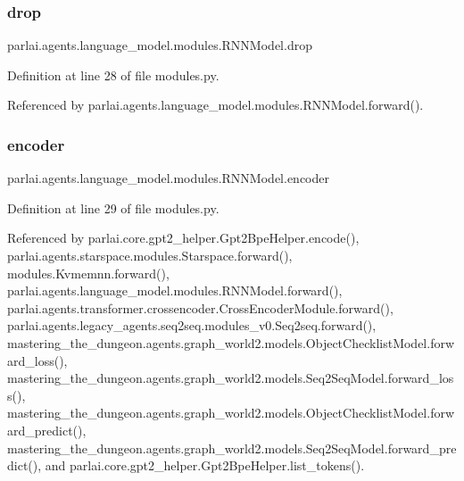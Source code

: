 \subsubsection{\texorpdfstring{drop}{drop}}
{\footnotesize\ttfamily parlai.\+agents.\+language\+\_\+model.\+modules.\+R\+N\+N\+Model.\+drop}



Definition at line 28 of file modules.\+py.



Referenced by parlai.\+agents.\+language\+\_\+model.\+modules.\+R\+N\+N\+Model.\+forward().

\mbox{\label{classparlai_1_1agents_1_1language__model_1_1modules_1_1RNNModel_a40a2e161a2f4f1d78b1a7f55e5d4fc26}} 
\subsubsection{\texorpdfstring{encoder}{encoder}}
{\footnotesize\ttfamily parlai.\+agents.\+language\+\_\+model.\+modules.\+R\+N\+N\+Model.\+encoder}



Definition at line 29 of file modules.\+py.



Referenced by parlai.\+core.\+gpt2\+\_\+helper.\+Gpt2\+Bpe\+Helper.\+encode(), parlai.\+agents.\+starspace.\+modules.\+Starspace.\+forward(), modules.\+Kvmemnn.\+forward(), parlai.\+agents.\+language\+\_\+model.\+modules.\+R\+N\+N\+Model.\+forward(), parlai.\+agents.\+transformer.\+crossencoder.\+Cross\+Encoder\+Module.\+forward(), parlai.\+agents.\+legacy\+\_\+agents.\+seq2seq.\+modules\+\_\+v0.\+Seq2seq.\+forward(), mastering\+\_\+the\+\_\+dungeon.\+agents.\+graph\+\_\+world2.\+models.\+Object\+Checklist\+Model.\+forward\+\_\+loss(), mastering\+\_\+the\+\_\+dungeon.\+agents.\+graph\+\_\+world2.\+models.\+Seq2\+Seq\+Model.\+forward\+\_\+loss(), mastering\+\_\+the\+\_\+dungeon.\+agents.\+graph\+\_\+world2.\+models.\+Object\+Checklist\+Model.\+forward\+\_\+predict(), mastering\+\_\+the\+\_\+dungeon.\+agents.\+graph\+\_\+world2.\+models.\+Seq2\+Seq\+Model.\+forward\+\_\+predict(), and parlai.\+core.\+gpt2\+\_\+helper.\+Gpt2\+Bpe\+Helper.\+list\+\_\+tokens().

